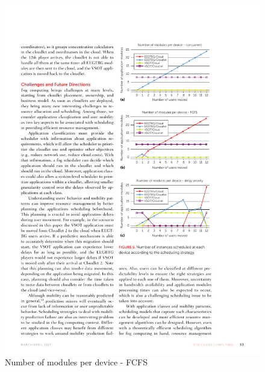 \documentclass[10pt, pdf, xcolor=pdftex, dvipsnames, table]{beamer}
\begin{document}
\begin{frame}
 	\begin{figure}[htbp]
 		\centerline{\includegraphics[scale=1.2]{images/5b.pdf}}
 		\caption[Number of modules per device - FCFS]{Number of modules per device - FCFS}
 	\end{figure}
\end{frame}
\end{document}
